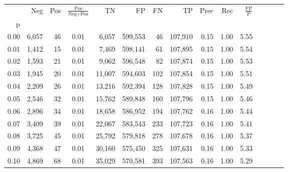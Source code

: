 \begin{tabular}{rrrcrrrrrrrrrrr}
\toprule
{} &     Neg &    Pos & $\frac{\text{Pos}}{\text{Neg}+\text{Pos}}$ &       TN &       FP &       FN &       TP &  Prec &   Rec & $\frac{\text{FP}}{\text{P}}$ \\
p    &         &        &                                            &          &          &          &          &       &       &                              \\
\midrule
0.00 &   6,057 &     46 &                                       0.01 &    6,057 &  599,553 &       46 &  107,910 &  0.15 &  1.00 &                         5.55 \\
0.01 &   1,412 &     15 &                                       0.01 &    7,469 &  598,141 &       61 &  107,895 &  0.15 &  1.00 &                         5.54 \\
0.02 &   1,593 &     21 &                                       0.01 &    9,062 &  596,548 &       82 &  107,874 &  0.15 &  1.00 &                         5.53 \\
0.03 &   1,945 &     20 &                                       0.01 &   11,007 &  594,603 &      102 &  107,854 &  0.15 &  1.00 &                         5.51 \\
0.04 &   2,209 &     26 &                                       0.01 &   13,216 &  592,394 &      128 &  107,828 &  0.15 &  1.00 &                         5.49 \\
0.05 &   2,546 &     32 &                                       0.01 &   15,762 &  589,848 &      160 &  107,796 &  0.15 &  1.00 &                         5.46 \\
0.06 &   2,896 &     34 &                                       0.01 &   18,658 &  586,952 &      194 &  107,762 &  0.16 &  1.00 &                         5.44 \\
0.07 &   3,409 &     39 &                                       0.01 &   22,067 &  583,543 &      233 &  107,723 &  0.16 &  1.00 &                         5.41 \\
0.08 &   3,725 &     45 &                                       0.01 &   25,792 &  579,818 &      278 &  107,678 &  0.16 &  1.00 &                         5.37 \\
0.09 &   4,368 &     47 &                                       0.01 &   30,160 &  575,450 &      325 &  107,631 &  0.16 &  1.00 &                         5.33 \\
0.10 &   4,869 &     68 &                                       0.01 &   35,029 &  570,581 &      393 &  107,563 &  0.16 &  1.00 &                         5.29 \\

\end{tabular}

